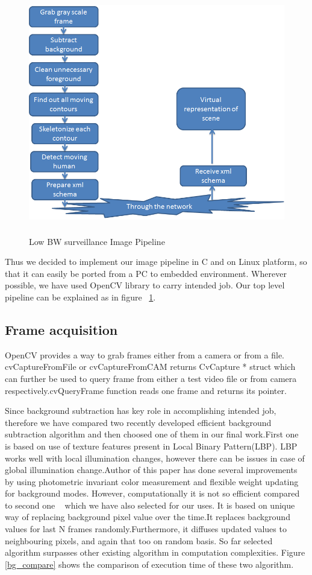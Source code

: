 \begin{figure}[!t]
\centering
\includegraphics[height=300pt]{Figures/image_pipeline}
\caption{Low BW surveillance Image Pipeline}
\label{image_pipeline}
\end{figure}

Thus we decided to implement our image pipeline in C and on Linux
platform, so that it can easily be ported from a PC to embedded
environment. Wherever possible, we have used OpenCV library to carry
intended job. Our top level pipeline can be explained as in figure
~\ref{image_pipeline}.\\

\subsection{Frame acquisition}

OpenCV provides a way to grab frames either from a camera or from a
file. cvCaptureFromFile or cvCaptureFromCAM returns CvCapture * struct
which can further be used to query frame from either a test video file
or from camera respectively.cvQueryFrame function reads one frame and
returns its pointer. 

Since background subtraction has key role in accomplishing intended job,
therefore we have compared two recently developed efficient background
subtraction algorithm and then choosed one of them in our final
work.First one ~\cite{11} is based on use of texture features present in
Local Binary Pattern(LBP). LBP works well with local illumination
changes, however there can be issues in case of global illumination
change.Author of this paper has done several improvements by using
photometric invariant color measurement and flexible weight updating for
background modes. However, computationally it is not so efficient
compared to second one ~\cite{9} which we have also selected for our
uses.  It is based on unique way of replacing background pixel value
over the time.It replaces background values for last N frames
randomly.Furthermore, it diffuses updated values to neighbouring pixels,
and again that too on random basis. So far selected algorithm surpasses
other existing algorithm in computation complexities. Figure
\ref{bg_compare} shows the comparison of execution time of these two
algorithm.


